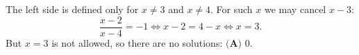 The left side is defined only for $x\ne3$ and $x\ne4$. For such $x$ we may cancel $x-3$:
\[\dfrac{x-2}{x-4}=-1\iff x-2=4-x\iff x=3.\]
But $x=3$ is not allowed, so there are no solutions: $\boxed{\textbf{(A) }0}$.
